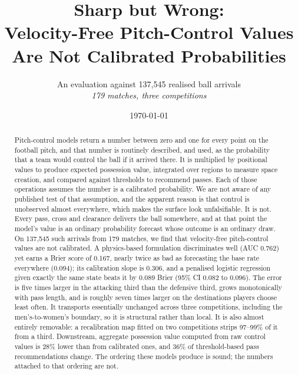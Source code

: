 \documentclass[11pt,a4paper]{article}
\title{\bfseries Sharp but Wrong:\\[0.25em]
\large Velocity-Free Pitch-Control Values Are Not Calibrated Probabilities}
\author{%
  \normalsize An evaluation against 137{,}545 realised ball arrivals\\
  \normalsize\itshape 179 matches, three competitions
}
\date{\normalsize\today}
\begin{document}
\maketitle
\thispagestyle{empty}

\begin{abstract}
\noindent
Pitch-control models return a number between zero and one for every point on the
football pitch, and that number is routinely described, and used, as the
probability that a team would control the ball if it arrived there. It is
multiplied by positional values to produce expected possession value, integrated
over regions to measure space creation, and compared against thresholds to
recommend passes. Each of those operations assumes the number is a calibrated
probability. We are not aware of any published test of that assumption, and the
apparent reason is that control is unobserved almost everywhere, which makes the
surface look unfalsifiable. It is not. Every pass, cross and clearance delivers
the ball somewhere, and at that point the model's value is an ordinary
probability forecast whose outcome is an ordinary draw. On 137{,}545 such
arrivals from 179 matches, we find that velocity-free pitch-control values are
not calibrated. A physics-based formulation discriminates well (AUC 0.762) yet
earns a Brier score of 0.167, nearly twice as bad as forecasting the base rate
everywhere (0.094); its calibration slope is 0.306, and a penalised logistic
regression given exactly the same state beats it by 0.089 Brier
(95\% CI 0.082 to 0.096). The error is five times larger in the attacking third
than the defensive third, grows monotonically with pass length, and is roughly
seven times larger on the destinations players choose least often. It transports
essentially unchanged across three competitions, including the men's-to-women's
boundary, so it is structural rather than local. It is also almost entirely
removable: a recalibration map fitted on two competitions strips 97--99\% of it
from a third. Downstream, aggregate possession value computed from raw control
values is 28\% lower than from calibrated ones, and 36\% of threshold-based pass
recommendations change. The ordering these models produce is sound; the numbers
attached to that ordering are not.
\end{abstract}

\vspace{0.6em}
\end{document}
